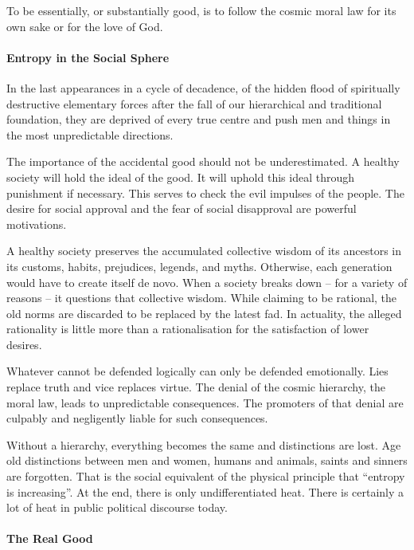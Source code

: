 To be essentially, or substantially good, is to follow the cosmic moral law for its own sake or for the love of God.

\paragraph{Entropy in the Social Sphere}


\begin{quotex}
In the last appearances in a cycle of decadence, of the hidden flood of spiritually destructive elementary forces after the fall of our hierarchical and traditional foundation, they are deprived of every true centre and push men and things in the most unpredictable directions.
\end{quotex}


The importance of the accidental good should not be underestimated. A healthy society will hold the ideal of the good. It will uphold this ideal through punishment if necessary. This serves to check the evil impulses of the people. The desire for social approval and the fear of social disapproval are powerful motivations.

A healthy society preserves the accumulated collective wisdom of its ancestors in its customs, habits, prejudices, legends, and myths. Otherwise, each generation would have to create itself de novo. When a society breaks down -- for a variety of reasons -- it questions that collective wisdom. While claiming to be rational, the old norms are discarded to be replaced by the latest fad. In actuality, the alleged rationality is little more than a rationalisation for the satisfaction of lower desires.

Whatever cannot be defended logically can only be defended emotionally. Lies replace truth and vice replaces virtue. The denial of the cosmic hierarchy, the moral law, leads to unpredictable consequences. The promoters of that denial are culpably and negligently liable for such consequences.

Without a hierarchy, everything becomes the same and distinctions are lost. Age old distinctions between men and women, humans and animals, saints and sinners are forgotten. That is the social equivalent of the physical principle that ``entropy is increasing''. At the end, there is only undifferentiated heat. There is certainly a lot of heat in public political discourse today.

\paragraph{The Real Good}


